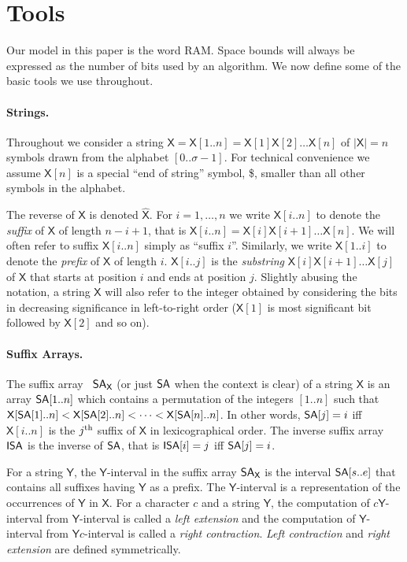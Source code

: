 \documentclass[11pt,runningheads]{llncs}
\def\reverse#1{\hat{#1}}
\def\SA{\mbox{\rm {\sf SA}}}
\def\ISA{\mbox{\rm {\sf ISA}}}
\def\X{\mathsf{X}}
\def\Y{\mbox{\rm {\sf Y}}}
\def\Y{\mathsf{Y}}
\begin{document}
\section{Tools}
\label{sec-preliminaries}

Our model in this paper is the word RAM. Space bounds will always be expressed
as the number of bits used by an algorithm. We now define some of the basic tools
we use throughout.

\paragraph{Strings.}
Throughout we consider a string $\X = \X[1..n] = \X[1]\X[2]\ldots
\X[n]$ of $|\X| = n$ symbols drawn from the alphabet $[0..\sigma-1]$.
For technical convenience we assume $\X[n]$ is a special ``end of string'' symbol, \$, smaller than
all other symbols in the alphabet.

The reverse of $\X$ is denoted $\reverse{\X}$.  For $i=1,\ldots,n$ we
write $\X[i..n]$ to denote the {\em suffix} of $\X$ of length $n-i+1$,
that is $\X[i..n] = \X[i]\X[i+1]\ldots \X[n]$.  We will often refer to
suffix $\X[i..n]$ simply as ``suffix $i$''. Similarly, we write
$\X[1..i]$ to denote the {\em prefix} of $\X$ of length $i$.
$\X[i..j]$ is the {\em substring} $\X[i]\X[i+1]\ldots \X[j]$ of $\X$
that starts at position $i$ and ends at position $j$. 
Slightly abusing the notation, a string $\X$ will also refer 
to the integer obtained by considering the bits in decreasing 
significance in left-to-right order ($\X[1]$ is most significant 
bit followed by $\X[2]$ and so on). 

 \paragraph{Suffix Arrays.}
 The suffix array~\cite{mm1993} $\SA_{\X}$ 
 (or just $\SA$ when the context is clear)
 of a string $\X$
 is an array $\SA[1..n]$ which
 contains a permutation of the integers $[1..n]$ such that $\X[\SA[1]..n]
 < \X[\SA[2]..n] < \cdots < \X[\SA[n]..n]$.  In other words, $\SA[j] =
 i$ iff $\X[i..n]$ is the $j^{\mbox{{\scriptsize th}}}$ suffix of $\X$
 in lexicographical order.
 The inverse
 suffix array $\ISA$ is the inverse of $\SA$, that is
 $\ISA[i] = j$ iff $\SA[j] = i$.


 For a string $\Y$, the $\Y$-interval in the suffix array $\SA_{\X}$ is
 the interval $\SA[s..e]$ that contains all suffixes having $\Y$ as a
 prefix. The $\Y$-interval is a representation of the occurrences of
 $\Y$ in $\X$. For a character $c$ and a string $\Y$, the computation
 of $c\Y$-interval from $\Y$-interval is called a \emph{left extension}
 and the computation of $\Y$-interval from ${\Y}c$-interval is called a
 \emph{right contraction}. \emph{Left contraction} and \emph{right
   extension} are defined symmetrically.
\end{document}
